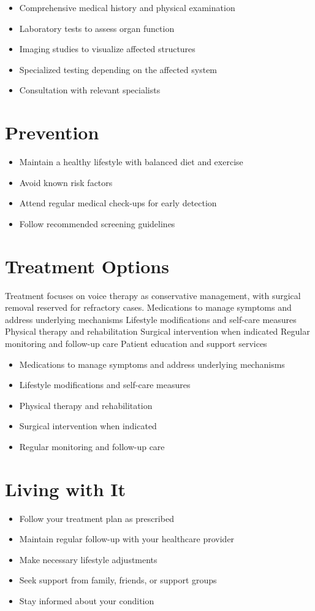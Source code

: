 \begin{itemize}[noitemsep]
  \item Comprehensive medical history and physical examination
  \item Laboratory tests to assess organ function
  \item Imaging studies to visualize affected structures
  \item Specialized testing depending on the affected system
  \item Consultation with relevant specialists
\end{itemize}
\section{Prevention}
\begin{itemize}[noitemsep]
  \item Maintain a healthy lifestyle with balanced diet and exercise
  \item Avoid known risk factors
  \item Attend regular medical check-ups for early detection
  \item Follow recommended screening guidelines
\end{itemize}
\section{Treatment Options}
Treatment focuses on voice therapy as conservative management, with surgical removal reserved for refractory cases. Medications to manage symptoms and address underlying mechanisms Lifestyle modifications and self-care measures Physical therapy and rehabilitation Surgical intervention when indicated Regular monitoring and follow-up care Patient education and support services

\begin{itemize}[noitemsep]
  \item Medications to manage symptoms and address underlying mechanisms
  \item Lifestyle modifications and self-care measures
  \item Physical therapy and rehabilitation
  \item Surgical intervention when indicated
  \item Regular monitoring and follow-up care
\end{itemize}
\section{Living with It}
\begin{itemize}[noitemsep]
  \item Follow your treatment plan as prescribed
  \item Maintain regular follow-up with your healthcare provider
  \item Make necessary lifestyle adjustments
  \item Seek support from family, friends, or support groups
  \item Stay informed about your condition
\end{itemize}
